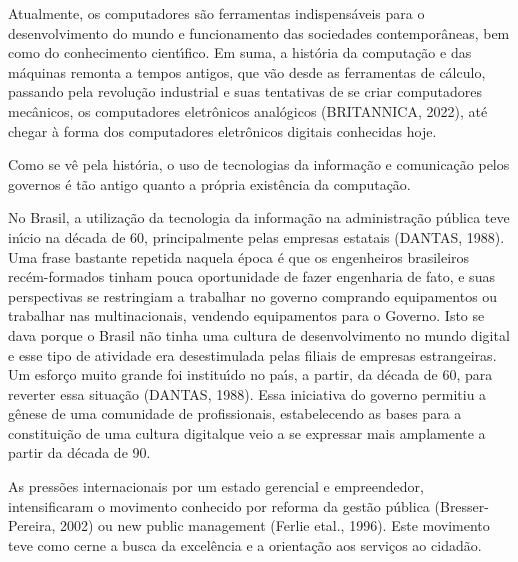 \documentclass[
12pt,		%
openright,	%
twoside,  %
a4paper,			%
chapter=TITLE,		%
english,			%
french,				%
spanish,			%
brazil				%
]{USPSC-classe/USPSC}
\begin{document}
Atualmente, os computadores s\~ao ferramentas indispens\'aveis para o desenvolvimento do mundo e funcionamento das sociedades contempor\^aneas, bem como do conhecimento cient\'{\i}fico. Em suma, a hist\'oria da computa\c{c}\~ao e das m\'aquinas remonta a tempos antigos, que v\~ao desde as ferramentas de c\'alculo, passando pela revolu\c{c}\~ao industrial e suas tentativas de se criar computadores mec\^anicos, os computadores eletr\^onicos anal\'ogicos  (BRITANNICA, 2022), at\'e chegar \`a forma dos computadores eletr\^onicos digitais conhecidas hoje.








Como se v\^e pela hist\'oria, o uso de tecnologias da informa\c{c}\~ao e comunica\c{c}\~ao pelos governos \'e t\~ao antigo quanto a pr\'opria exist\^encia da computa\c{c}\~ao.








No Brasil, a utiliza\c{c}\~ao da tecnologia da informa\c{c}\~ao na administra\c{c}\~ao p\'ublica teve in\'{\i}cio na d\'ecada de 60, principalmente pelas empresas estatais  (DANTAS, 1988). Uma frase bastante repetida naquela \'epoca \'e que os engenheiros brasileiros rec\'em-formados tinham pouca oportunidade de fazer engenharia de fato, e suas perspectivas se restringiam a trabalhar no governo comprando equipamentos ou trabalhar nas multinacionais, vendendo equipamentos para o Governo. Isto se dava porque o Brasil n\~ao tinha uma cultura de desenvolvimento no mundo digital e esse tipo de atividade era desestimulada pelas filiais de empresas estrangeiras. Um esfor\c{c}o muito grande foi institu\'{\i}do no pa\'{\i}s, a partir, da d\'ecada de 60, para reverter essa situa\c{c}\~ao  (DANTAS, 1988). Essa iniciativa do governo permitiu a g\^enese de uma comunidade de profissionais, estabelecendo as bases para a constitui\c{c}\~ao de uma \textquotedbl  cultura digital\textquotedbl  que veio a se expressar mais amplamente a partir da d\'ecada de 90.








As press\~oes internacionais por um estado gerencial e empreendedor, intensificaram o movimento conhecido por reforma da gest\~ao p\'ublica (Bresser-Pereira, 2002) ou new public management (Ferlie etal., 1996). Este movimento teve como cerne a busca da excel\^encia e a orienta\c{c}\~ao aos servi\c{c}os ao cidad\~ao.
\end{document}
